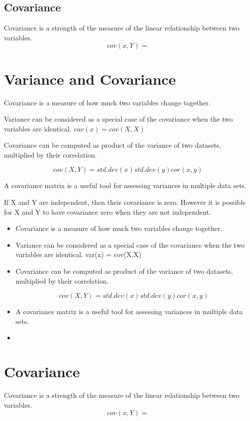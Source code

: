 
\subsection{Covariance}
Covariance is a strength of the measure of the linear relationship between two variables.
\[ cov(x,Y) = \]



	\section{Variance and Covariance}
	Covariance is a measure of how much two variables change together. 
	
	Variance can be considered as a special case of the covariance when the two variables are identical.
	$var(x) = cov(X,X)$
	
	Covariance can be computed as product of the variance of two datasets, multiplied by their correlation.
	
	\[
	cov(X,Y) = std.dev (x) std.dev(y) cor(x,y)
	\]
	
	A covariance matrix is a useful tool for assessing variances in multiple data sets.
	
	
	If X and Y are independent, then their covariance is zero. However it is possible for X and Y to have covariance zero when they are not independent.
	
	
	\begin{itemize}
		\item Covariance is a measure of how much two variables change together. 
		
		\item	Variance can be considered as a special case of the covariance when the two variables are identical. 
		var(x) = cov(X,X)
		
		\item Covariance can be computed as product of the variance of two datasets, multiplied by their correlation.
		
		\[cov(X,Y) = std.dev (x) std.dev(y) cor(x,y)\]
		
		
		\item	A covariance matrix is a useful tool for assessing variances in multiple data sets.
		\item 
	\end{itemize}
	
\section{Covariance}
Covariance is a strength of the measure of the linear relationship between two variables.
\[ cov(x,Y) = \]

	
	
	
	
	
	
	
